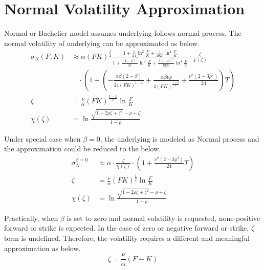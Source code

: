 \documentclass{article}
\begin{document}
\section{Normal Volatility Approximation}

Normal or Bachelier model assumes underlying follows normal process.
The normal volatility of underlying can be approximated as below.
\begin{subequations}
    \begin{align}
        \sigma_N{(F, K)} &\approx \alpha {\left(F K\right)}^{\frac{\beta}{2}} \frac{1 + \frac{1}{24} \ln^2{\frac{F}{K}} + \frac{1}{1920} \ln^4{\frac{F}{K}}}{1 + \frac{\left(1 - \beta\right)^{2}}{24} \ln^2{\frac{F}{K}} + \frac{\left(1 - \beta\right)^{4}}{1920} \ln^4{\frac{F}{K}}} \cdot \frac{\zeta}{\chi \left(\zeta\right)}\nonumber \\
        & \quad \cdot \left(1 + \left(-\frac{\alpha \beta (2 - \beta)}{24 {\left(F K\right)}^{1 - \beta}} + \frac{\alpha \beta \nu \rho}{4 {\left(F K\right)}^{\frac{1 - \beta}{2}}} + \frac{\nu^2 \left(2 - 3 \rho^2\right)}{24}\right) T \right)\\
        \zeta &= \frac{\nu}{\alpha} {(F K)}^{\frac{1 - \beta}{2}} \ln{\frac{F}{K}} \\
        \chi(\zeta) &= \ln{\frac{\sqrt{1 - 2 \rho \zeta + {\zeta}^2} - \rho + \zeta}{1 - \rho}}
    \end{align}
\end{subequations}

Under special case when $ \beta = 0 $, the underlying is modeled as Normal process and the approximation could be reduced to the below.
\begin{subequations}
    \begin{align}
        \sigma_N^{\beta=0} &\approx \alpha \cdot \frac{\zeta}{\chi(\zeta)} \cdot \left(1 + \frac{\nu^2 \left(2 - 3 \rho^2\right)}{24} T \right) \\
        \zeta &= \frac{\nu}{\alpha} (F K)^{\frac{1}{2}} \ln{\frac{F}{K}} \\
        \chi(\zeta) &= \ln{\frac{\sqrt{1 - 2 \rho \zeta + \zeta^2} - \rho + \zeta}{1 - \rho}}
    \end{align}
\end{subequations}

Practically, when $ \beta $ is set to zero and normal volatility is requested, none-positive forward or strike is expected.
In the case of zero or negative forward or strike, $ \zeta $ term is undefined.
Therefore, the volatility requires a different and meaningful approximation as below.
\begin{equation}
    \zeta = \frac{\nu}{\alpha} \left(F - K\right)
\end{equation}
\end{document}
